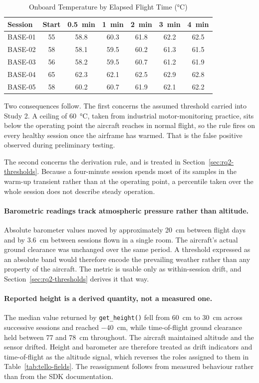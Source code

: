 \begin{table}[htbp]
\centering
\caption{Onboard Temperature by Elapsed Flight Time (\si{\celsius})}
\label{tab:temp-settling}
\small
\begin{tabular}{|l|c|c|c|c|c|c|}
\hline
\textbf{Session} & \textbf{Start} & \SI{0.5}{min} & \SI{1}{min} &
\SI{2}{min} & \SI{3}{min} & \SI{4}{min} \\
\hline
BASE-01 & 55 & 58.8 & 60.3 & 61.8 & 62.2 & 62.5 \\
BASE-02 & 58 & 58.1 & 59.5 & 60.2 & 61.3 & 61.5 \\
BASE-03 & 56 & 58.2 & 59.5 & 60.7 & 61.2 & 61.9 \\
BASE-04 & 65 & 62.3 & 62.1 & 62.5 & 62.9 & 62.8 \\
BASE-05 & 58 & 60.2 & 60.7 & 61.9 & 62.1 & 62.2 \\
\hline
\end{tabular}
\end{table}

Two consequences follow. The first concerns the assumed threshold carried into
Study 2. A ceiling of \SI{60}{\celsius}, taken from industrial motor-monitoring
practice, sits below the operating point the aircraft reaches in normal flight,
so the rule fires on every healthy session once the airframe has warmed. That
is the false positive observed during preliminary testing.

The second concerns the derivation rule, and is treated in
Section~\ref{sec:rq2-thresholds}. Because a four-minute session spends most of
its samples in the warm-up transient rather than at the operating point, a
percentile taken over the whole session does not describe steady operation.

\paragraph{Barometric readings track atmospheric pressure rather than altitude.}
Absolute barometer values moved by approximately \SI{20}{\centi\metre} between
flight days and by \SI{3.6}{\centi\metre} between sessions flown in a single
room. The aircraft's actual ground clearance was unchanged over the same period.
A threshold expressed as an absolute band would therefore encode the prevailing
weather rather than any property of the aircraft. The metric is usable only as
within-session drift, and Section~\ref{sec:rq2-thresholds} derives it that way.

\paragraph{Reported height is a derived quantity, not a measured one.} The
median value returned by \texttt{get\_height()} fell from \SI{60}{\centi\metre}
to \SI{30}{\centi\metre} across successive sessions and reached
\SI{-40}{\centi\metre}, while time-of-flight ground clearance held between
\SI{77}{} and \SI{78}{\centi\metre} throughout. The aircraft maintained
altitude and the sensor drifted. Height and barometer are therefore treated as
drift indicators and time-of-flight as the altitude signal, which reverses the
roles assigned to them in Table~\ref{tab:tello-fields}. The reassignment follows
from measured behaviour rather than from the SDK documentation.

